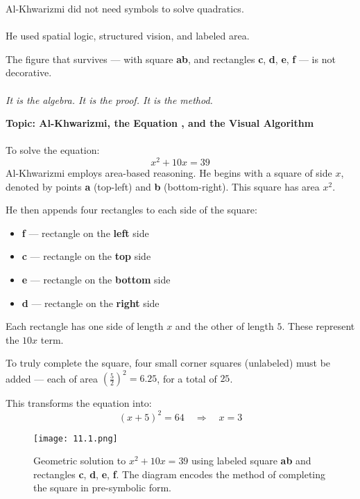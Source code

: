\documentclass[9pt]{article}
\begin{document}
Al-Khwarizmi did not need symbols to solve quadratics. \\\\
He used spatial logic, structured vision, and labeled area.

The figure that survives --- with square \textbf{ab}, and rectangles \textbf{c}, \textbf{d}, \textbf{e}, \textbf{f} --- is not decorative. \\\\
\textit{It is the algebra. It is the proof. It is the method.}

\vspace{1em}

\textbf{Topic: Al-Khwarizmi, the Equation , and the Visual Algorithm} \\\\
To solve the equation:
\[
x^2 + 10x = 39
\]
Al-Khwarizmi employs area-based reasoning. He begins with a square of side $x$, denoted by points \textbf{a} (top-left) and \textbf{b} (bottom-right). This square has area $x^2$.

He then appends four rectangles to each side of the square:
\begin{itemize}
    \item \textbf{f} --- rectangle on the \textbf{left} side
    \item \textbf{c} --- rectangle on the \textbf{top} side
    \item \textbf{e} --- rectangle on the \textbf{bottom} side
    \item \textbf{d} --- rectangle on the \textbf{right} side
\end{itemize}

Each rectangle has one side of length $x$ and the other of length $5$. These represent the $10x$ term.

To truly complete the square, four small corner squares (unlabeled) must be added --- each of area $\left(\frac{5}{2}\right)^2 = 6.25$, for a total of $25$.

This transforms the equation into:
\[
(x + 5)^2 = 64 \quad \Rightarrow \quad x = 3
\]

\vspace{1em}

\begin{figure}[H]
  \centering
  \texttt{[image: 11.1.png]}
  \caption{Geometric solution to $x^2 + 10x = 39$ using labeled square \textbf{ab} and rectangles \textbf{c}, \textbf{d}, \textbf{e}, \textbf{f}. The diagram encodes the method of completing the square in pre-symbolic form.}
\end{figure}
\end{document}
